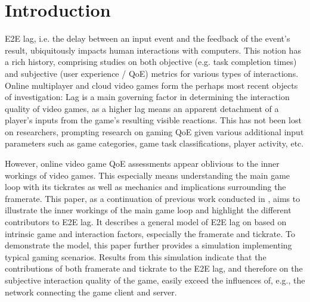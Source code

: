 \section{Introduction}
\label{sec:introduction}

\gls{E2E} lag, i.e. the delay between an input event and the feedback of the event's result, ubiquitously impacts human interactions with computers. This notion has a rich history, comprising studies on both objective (e.g. task completion times) and subjective (user experience / \gls{QoE}) metrics for various types of interactions. Online multiplayer and cloud video games form the perhaps most recent objects of investigation: Lag is a main governing factor in determining the interaction quality of video games, as a higher lag means an apparent detachment of a player's inputs from the game's resulting visible reactions. This has not been lost on researchers, prompting research on gaming \gls{QoE} given various additional input parameters such as game categories, game task classifications, player activity, etc. %

However, online video game \gls{QoE} assessments appear oblivious to the inner workings of video games. This especially means understanding the main game loop with its tickrates as well as mechanics and implications surrounding the framerate.
This paper, as a continuation of previous work conducted in \cite{metzger2016gamesframes}, aims to illustrate the inner workings of the main game loop and highlight the different contributors to \gls{E2E} lag. It describes a general model of \gls{E2E} lag on based on intrinsic game and interaction factors, especially the framerate and tickrate. To demonstrate the model, this paper further provides a simulation implementing typical gaming scenarios. Results from this simulation indicate that the contributions of both framerate and tickrate to the \gls{E2E} lag, and therefore on the subjective interaction quality of the game, easily exceed the influences of, e.g., the network connecting the game client and server.


